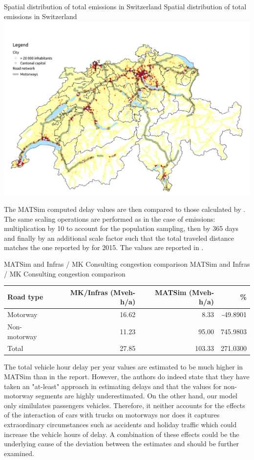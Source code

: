 \createfigure%
{Spatial distribution of total emissions in Switzerland}%
{Spatial distribution of total emissions in Switzerland}%
{\label{fig:spatialDelays}}%
{\includegraphics[width=1.0\textwidth, angle=0]{figures/total_delays_heatmap.pdf}}%
{}

The MATSim computed delay values are then compared to those calculated by \citet{mkinfras2016staukosten}.
The same scaling operations are performed as in the case of emissions: multiplication by 10 to account for the population sampling, then by 365 days and finally by an additional scale factor such that the total traveled distance matches the one reported by \citet{foen2010pollutants} for 2015.
The values are reported in .


\createtable%
{MATSim and Infras / MK Consulting congestion comparison}%
{MATSim and Infras / MK Consulting congestion comparison}%
{\label{tab:delayValueComparison}}%
{%
  \begin{tabular}[c]{lrrr}
    \toprule
    Road type & MK/Infras (Mveh-h/a) & MATSim (Mveh-h/a) & \%  \\ 
    \midrule
    Motorway      & 16.62 &    8.33 &  -49.8901 \\
    Non-motorway  & 11.23 &   95.00 &  745.9803 \\
    Total &         27.85 &  103.33 &  271.0300 \\
    \bottomrule
  \end{tabular}
}%
{}

The total vehicle hour delay per year values are estimated to be much higher in MATSim than in the report.
However, the authors do indeed state that they have taken an "at-least" approach in estimating delays and that the values for non-motorway segments are highly underestimated.
On the other hand, our model only similulates passengers vehicles.
Therefore, it neither accounts for the effects of the interaction of cars with trucks on motorways nor does it captures extraordinary circumstances such as accidents and holiday traffic which could increase the vehicle hours of delay.
A combination of these effects could be the underlying cause of the deviation between the estimates and should be further examined.


